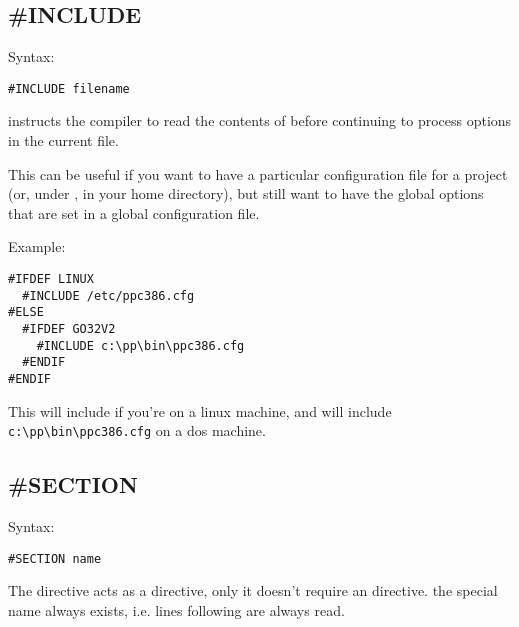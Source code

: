 \documentclass{book}
\begin{document}
\subsection{\#INCLUDE}
Syntax:
\begin{verbatim}
#INCLUDE filename
\end{verbatim}
 instructs the compiler to read the contents of
 before continuing to process options in the current file.

This can be useful if you want to have a particular configuration file
for a project (or, under \linux, in your home directory), but still want to
have the global options that are set in a global configuration file.

Example:
\begin{verbatim}
#IFDEF LINUX
  #INCLUDE /etc/ppc386.cfg
#ELSE
  #IFDEF GO32V2
    #INCLUDE c:\pp\bin\ppc386.cfg
  #ENDIF
#ENDIF
\end{verbatim}
This will include  if you're on a linux machine,
and will include \verb+c:\pp\bin\ppc386.cfg+
on a dos machine.

\subsection{\#SECTION}
Syntax:
\begin{verbatim}
#SECTION name
\end{verbatim}
The  directive acts as a  directive, only
it doesn't require an  directive. the special name 
always exists, i.e. lines following  are always read.

\end{document}
